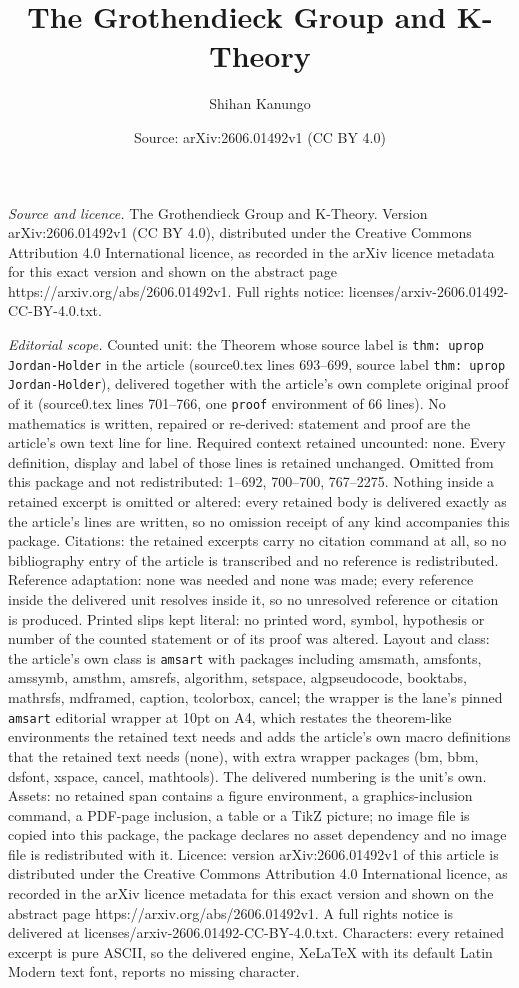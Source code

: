 \documentclass[10pt,a4paper]{amsart}
\title[The Grothendieck Group and K-Theory]{The Grothendieck Group and K-Theory}
\author{Shihan Kanungo}
\date{Source: arXiv:2606.01492v1 (CC BY 4.0)}
\begin{document}
\maketitle

\noindent\emph{Source and licence.} The Grothendieck Group and K-Theory. Version arXiv:2606.01492v1 (CC BY 4.0), distributed under the Creative Commons Attribution 4.0 International licence, as recorded in the arXiv licence metadata for this exact version and shown on the abstract page https://arxiv.org/abs/2606.01492v1. Full rights notice: licenses/arxiv-2606.01492-CC-BY-4.0.txt.\par\smallskip

\noindent\textit{Editorial scope.} Counted unit: the Theorem whose source label is \texttt{thm: uprop Jordan-Holder} in the article (source0.tex lines 693--699, source label \texttt{thm: uprop Jordan-Holder}), delivered together with the article's own complete original proof of it (source0.tex lines 701--766, one \texttt{proof} environment of 66 lines). No mathematics is written, repaired or re-derived: statement and proof are the article's own text line for line. Required context retained uncounted: none. Every definition, display and label of those lines is retained unchanged. Omitted from this package and not redistributed: 1--692, 700--700, 767--2275. Nothing inside a retained excerpt is omitted or altered: every retained body is delivered exactly as the article's lines are written, so no omission receipt of any kind accompanies this package. Citations: the retained excerpts carry no citation command at all, so no bibliography entry of the article is transcribed and no reference is redistributed. Reference adaptation: none was needed and none was made; every reference inside the delivered unit resolves inside it, so no unresolved reference or citation is produced. Printed slips kept literal: no printed word, symbol, hypothesis or number of the counted statement or of its proof was altered. Layout and class: the article's own class is \texttt{amsart} with packages including amsmath, amsfonts, amssymb, amsthm, amsrefs, algorithm, setspace, algpseudocode, booktabs, mathrsfs, mdframed, caption, tcolorbox, cancel; the wrapper is the lane's pinned \texttt{amsart} editorial wrapper at 10pt on A4, which restates the theorem-like environments the retained text needs and adds the article's own macro definitions that the retained text needs (none), with extra wrapper packages (bm, bbm, dsfont, xspace, cancel, mathtools). The delivered numbering is the unit's own. Assets: no retained span contains a figure environment, a graphics-inclusion command, a PDF-page inclusion, a table or a TikZ picture; no image file is copied into this package, the package declares no asset dependency and no image file is redistributed with it. Licence: version arXiv:2606.01492v1 of this article is distributed under the Creative Commons Attribution 4.0 International licence, as recorded in the arXiv licence metadata for this exact version and shown on the abstract page https://arxiv.org/abs/2606.01492v1. A full rights notice is delivered at licenses/arxiv-2606.01492-CC-BY-4.0.txt. Characters: every retained excerpt is pure ASCII, so the delivered engine, XeLaTeX with its default Latin Modern text font, reports no missing character.
\end{document}
